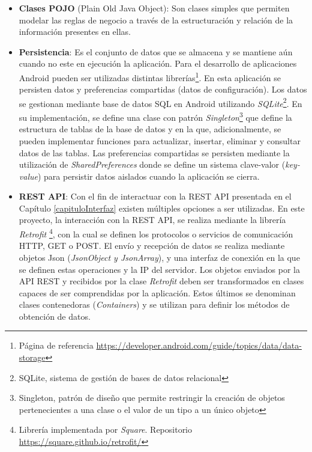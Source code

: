      \begin{itemize}
         \item \textbf{Clases POJO} (Plain Old Java Object): Son clases simples que permiten modelar las reglas de negocio a través de la estructuración y relación de la información presentes en ellas.
         
         
         \item \textbf{Persistencia}: Es el conjunto de datos que se almacena y se mantiene aún cuando no este en ejecución la aplicación. Para el desarrollo de aplicaciones Android pueden ser utilizadas distintas librerías\footnote{Página de referencia \url{https://developer.android.com/guide/topics/data/data-storage}}. En esta aplicación se persisten datos y preferencias compartidas (datos de configuración). Los datos se gestionan mediante base de datos SQL en Android utilizando \textit{SQLite}\footnote{SQLite, sistema de gestión de bases de datos relacional}. En su implementación, se define una clase con patrón \textit{Singleton}\footnote{Singleton, patrón de diseño que permite restringir la creación de objetos pertenecientes a una clase o el valor de un tipo a un único objeto} que define la estructura de tablas de la base de datos y en la que, adicionalmente, se pueden implementar funciones para actualizar, insertar, eliminar y consultar datos de las tablas. Las preferencias compartidas se persisten mediante la utilización de \textit{SharedPreferences} donde se define un sistema clave-valor (\textit{key-value}) para persistir datos aislados cuando la aplicación se cierra.
         
         \item \textbf{REST API}: Con el fin de interactuar con la REST API presentada en el Capítulo \ref{capituloInterfaz} existen múltiples opciones a ser utilizadas. En este proyecto, la interacción con la REST API, se realiza mediante la librería \textit{Retrofit} \footnote{Librería implementada por \textit{Square}. Repositorio \url{https://square.github.io/retrofit/}}, con la cual se definen los protocolos o servicios de comunicación HTTP, GET o POST. El envío y recepción de datos se realiza mediante objetos Json (\textit{JsonObject y JsonArray}), y una interfaz de conexión en la que se definen estas operaciones y la IP del servidor. Los objetos enviados por la API REST y recibidos por la clase \textit{Retrofit} deben ser transformados en clases capaces de ser comprendidas por la aplicación. Estos últimos se denominan clases contenedoras (\textit{Containers}) y se utilizan para  definir los métodos de obtención de datos.
        

\end{itemize}
